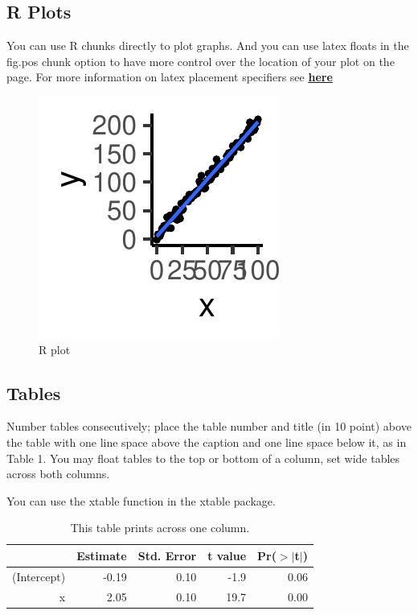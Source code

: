 \documentclass[10pt, letterpaper]{article}
\newenvironment{CodeChunk}{}{}
\begin{document}
\subsection{R Plots}\label{r-plots}

You can use R chunks directly to plot graphs. And you can use latex
floats in the fig.pos chunk option to have more control over the
location of your plot on the page. For more information on latex
placement specifiers see
\textbf{\href{https://en.wikibooks.org/wiki/LaTeX/Floats,_Figures_and_Captions}{here}}

\begin{CodeChunk}
\begin{figure}[H]

{\centering \includegraphics{figs/plot-1}

}

\caption[R plot]{R plot}\label{fig:plot}
\end{figure}
\end{CodeChunk}

\subsection{Tables}\label{tables}

Number tables consecutively; place the table number and title (in 10
point) above the table with one line space above the caption and one
line space below it, as in Table 1. You may float tables to the top or
bottom of a column, set wide tables across both columns.

You can use the xtable function in the xtable package.

\begin{table}[H]
\centering
\begin{tabular}{rrrrr}
  \hline
 & Estimate & Std. Error & t value & Pr($>$$|$t$|$) \\
  \hline
(Intercept) & -0.19 & 0.10 & -1.9 & 0.06 \\
  x & 2.05 & 0.10 & 19.7 & 0.00 \\
   \hline
\end{tabular}
\caption{This table prints across one column.}
\end{table}
\end{document}
